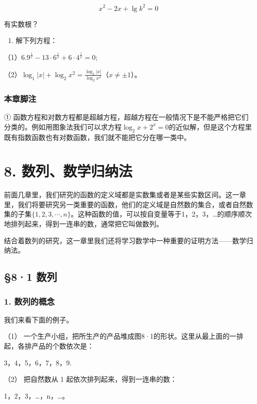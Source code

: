 \[
x^{2} - 2 x + \lg k^{2} = 0
\]

有实数根？

\begin{enumerate}[start=6]
\item
  解下列方程：
\end{enumerate}

（1）\(6.9^{\frac{1}{x}} - 13 \cdot 6^{\frac{1}{x}} + 6 \cdot 4^{\frac{1}{x}} = 0;\)

（2）\(\log_1|x| + \log_2x^2 = \frac{\log_1|x|}{\log_2x^2}\)（\(x \neq \pm 1\)）。

\subsection{本章脚注}

①
函数方程和对数方程都是超越方程，超越方程在一般情况下是不能严格把它们分类的。例如用图象法我们可以求方程\(\log_2 x + 2^x = 0\)的近似解，但是这个方程里既有指数函数也有对数函数，我们就不能把它分在哪一类中。

\chapter{8. 数列、数学归纳法}

前面几章里，我们研究的函数的定义域都是实数集或者是某些实数区间。这一章里，我们将要研究另一类重要的函数，他们的定义域是自然数的集合，或者自然数集的子集\(\{1, 2, 3, \cdots, n\}\)。这种函数的值，可以按自变量等于1，2，3，\ldots 的顺序顺次地排列起来，得到一连串的数，通常把它叫做数列。

结合着数列的研究，这一章里我们还将学习数学中一种重要的证明方法------数学归纳法。

\section{§8·1 数列}

\subsection{1. 数列的概念}

我们来看下面的例子。

（1）
一个生产小组，把所生产的产品堆成图8·1的形状。这里从最上面的一排起，各排产品的个数依次是：

3，4，5，6，7，8，9.

（2） 把自然数从 1 起依次排列起来，得到一连串的数：

1，2，3，\ldots，n，\ldots。

